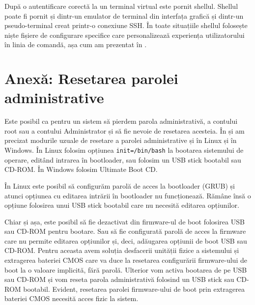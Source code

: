 
După o autentificare corectă la un terminal virtual este pornit shellul.
Shellul poate fi pornit și dintr-un emulator de terminal din interfața grafică
și dintr-un pseudo-terminal creat printr-o conexiune SSH. În toate situațiile
shellul folosește niște fișiere de configurare specifice care personalizează
experiența utilizatorului în linia de comandă, așa cum am prezentat în .

\section{Anexă: Resetarea parolei administrative}
\label{sec:boot:pass-reset}

Este posibil ca pentru un sistem să pierdem parola administrativă, a contului
root sau a contului Administrator și să fie nevoie de resetarea acesteia. În
 și  am precizat modurile
uzuale de resetare a parolei administrative și în Linux și în Windows. În Linux
folosim opțiunea \texttt{init=/bin/bash} la bootarea sistemului de operare, editând
intrarea în bootloader, sau folosim un USB stick bootabil sau CD-ROM. În
Windows folosim Ultimate Boot CD.

În Linux este posibil să configurăm parolă de acces la bootloader (GRUB) și
atunci opțiunea cu editarea intrării în bootloader nu funcționează. Rămâne însă
o opțiune folosirea unui USB stick bootabil care nu necesită editarea
opțiunilor.

Chiar și așa, este posibil să fie dezactivat din firmware-ul de boot folosirea
USB sau CD-ROM pentru bootare. Sau să fie configurată parolă de acces la firmware
care nu permite editarea opțiunilor și, deci, adăugarea opțiunii de boot USB sau
CD-ROM. Pentru aceasta avem soluția desfacerii unității fizice a sistemului și extragerea bateriei
CMOS care va duce la resetarea configurării firmware-ului de boot la o valoare
implicită, fără parolă. Ulterior vom activa bootarea de pe USB sau CD-ROM și vom
reseta parola administrativă folosind un USB stick sau CD-ROM bootabil. Evident,
resetarea parolei firmware-ului de boot prin extragerea bateriei CMOS necesită
acces fizic la sistem.


